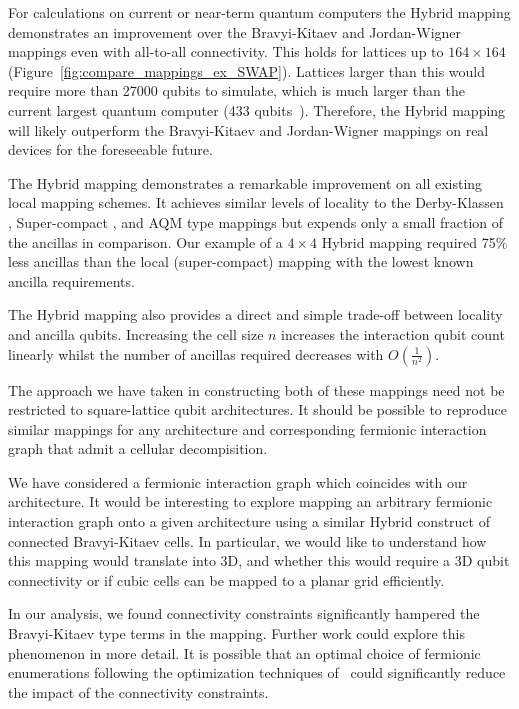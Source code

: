 \documentclass[pdftex,pra,aps,twocolumn,twoside]{revtex4-2}
\theoremstyle{plain}
\theoremstyle{note}
\newcommand\+{{\footnotesize \raisebox{0.3ex}{+}}}
\begin{document}
For calculations on current or near-term quantum computers the Hybrid mapping demonstrates an improvement over the Bravyi-Kitaev and Jordan-Wigner mappings even with all-to-all connectivity. This holds for lattices up to $164 \times 164$ (Figure~\ref{fig:compare_mappings_ex_SWAP}). Lattices larger than this would require more than 27000 qubits to simulate, which is much larger than the current largest quantum computer (433 qubits~\cite{gambetta2020ibm}). Therefore, the Hybrid mapping will likely outperform the Bravyi-Kitaev and Jordan-Wigner mappings on real devices for the foreseeable future.

The Hybrid\+ mapping demonstrates a remarkable improvement on all existing local mapping schemes. It achieves similar levels of locality to the Derby-Klassen \cite{derby2021compact}, Super-compact \cite{chen2022equivalence}, and  AQM \cite{steudtner2019quantum} type mappings but expends only a small fraction of the ancillas in comparison. Our example of a $4 \times 4$ Hybrid\+ mapping required 75\% less ancillas than the local (super-compact) mapping with the lowest known ancilla requirements.

The Hybrid\+ mapping also provides a direct and simple trade-off between locality and ancilla qubits. Increasing the cell size $n$ increases the interaction qubit count linearly whilst the number of ancillas required decreases with $O(\frac{1}{n^2})$.

The approach we have taken in constructing both of these mappings need not be restricted to square-lattice qubit architectures. It should be possible to reproduce similar mappings for any architecture and corresponding fermionic interaction graph that admit a cellular decompisition.

We have considered a fermionic interaction graph which coincides with our architecture. It would be interesting to explore mapping an arbitrary fermionic interaction graph onto a given architecture using a similar Hybrid construct of connected Bravyi-Kitaev cells. In particular, we would like to understand how this mapping would translate into 3D, and whether this would require a 3D qubit connectivity or if cubic cells can be mapped to a planar grid efficiently.

In our analysis, we found connectivity constraints significantly hampered the Bravyi-Kitaev type terms in the mapping. Further work could explore this phenomenon in more detail. It is possible that an optimal choice of fermionic enumerations following the optimization techniques of~\cite{chiew2021optimal} could significantly reduce the impact of the connectivity constraints.
\end{document}
